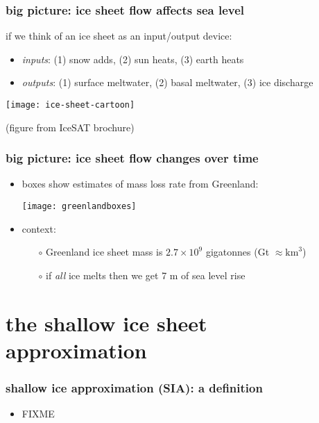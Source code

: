 \documentclass{beamer}
\begin{document}
\begin{frame}
  \frametitle{big picture: ice sheet flow affects sea level}

\small
if we think of an ice sheet as an input/output device:
\begin{itemize}
\item \emph{inputs}: (1) snow adds, (2) sun heats, (3) earth heats
\item \emph{outputs}: (1) surface meltwater, (2) basal meltwater, (3) ice discharge
\end{itemize}

\begin{center}
  \texttt{[image: ice-sheet-cartoon]}

  \tiny (figure from IceSAT brochure)
\end{center}
\end{frame}


\begin{frame}
  \frametitle{big picture: ice sheet flow changes over time}

\small
\begin{itemize}
\item boxes show estimates of mass loss rate from Greenland:
\begin{center}
    \texttt{[image: greenlandboxes]}
\end{center}

\vspace{-0.21in}
\item context:
  \begin{itemize}
  \item[$\circ$]  Greenland ice sheet mass is $2.7 \times 10^9$ gigatonnes (Gt $\approx \text{km}^3$) %
  \item[$\circ$]  if \emph{all} ice melts then we get 7 m of sea level rise
  \end{itemize}
\end{itemize}
\end{frame}


\section[shallow ice approximation]{the shallow ice sheet approximation}


\begin{frame}
  \frametitle{shallow ice approximation (SIA): a definition}

\begin{itemize}
\item FIXME
\end{itemize}
\end{frame}
\end{document}
